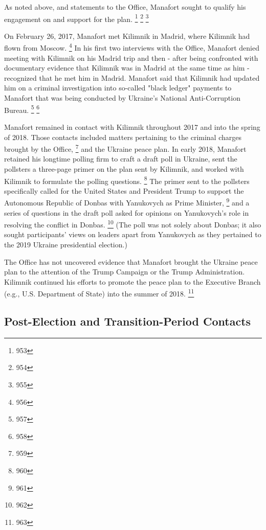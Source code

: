 As noted above,
and statements to the Office, Manafort sought to qualify his engagement on and support for the plan.
\footnote{953}
\footnote{954}
\footnote{955}

On February 26, 2017, Manafort met Kilimnik in Madrid, where Kilimnik had flown from Moscow.%
\footnote{956}
In his first two interviews with the Office, Manafort denied meeting with Kilimnik on his Madrid trip and then - after being confronted with documentary evidence that Kilimnik was in Madrid at the same time as him - recognized that he met him in Madrid.
Manafort said that Kilimnik had updated him on a criminal investigation into so-called "black ledger" payments to Manafort that was being conducted by Ukraine's National Anti-Corruption Bureau.%
\footnote{957}
\footnote{958}

Manafort remained in contact with Kilimnik throughout 2017 and into the spring of 2018.
Those contacts included matters pertaining to the criminal charges brought by the Office,%
\footnote{959}
and the Ukraine peace plan.
In early 2018, Manafort retained his longtime polling firm to craft a draft poll in Ukraine, sent the pollsters a three-page primer on the plan sent by Kilimnik, and worked with Kilimnik to formulate the polling questions.%
\footnote{960}
The primer sent to the pollsters specifically called for the United States and President Trump to support the Autonomous Republic of Donbas with Yanukovych as Prime Minister,%
\footnote{961}
and a series of questions in the draft poll asked for opinions on Yanukovych's role in resolving the conflict in Donbas.%
\footnote{962}
(The poll was not solely about Donbas; it also sought participants' views on leaders apart from Yanukovych as they pertained to the 2019 Ukraine presidential election.)

The Office has not uncovered evidence that Manafort brought the Ukraine peace plan to the attention of the Trump Campaign or the Trump Administration.
Kilimnik continued his efforts to promote the peace plan to the Executive Branch (e.g., U.S. Department of State) into the summer of 2018.%
\footnote{963}

\subsection{Post-Election and Transition-Period Contacts}

